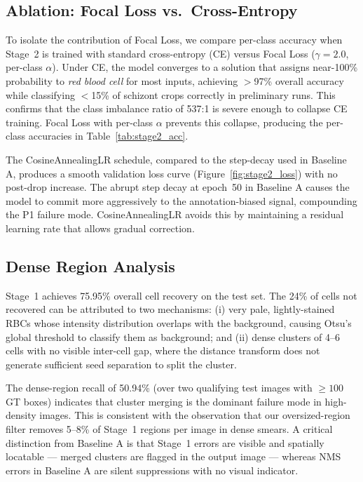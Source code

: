 \documentclass[10pt,twocolumn]{article}
\begin{document}
\subsection{Ablation: Focal Loss vs.\ Cross-Entropy}
\label{ssec:ablation}

To isolate the contribution of Focal Loss, we compare per-class accuracy
when Stage~2 is trained with standard cross-entropy (CE) versus Focal Loss
($\gamma = 2.0$, per-class $\alpha$). Under CE, the model converges to a
solution that assigns near-100\% probability to \textit{red blood cell}
for most inputs, achieving $>$97\% overall accuracy while classifying
$<$15\% of schizont crops correctly in preliminary runs. This confirms
that the class imbalance ratio of 537:1 is severe enough to collapse CE
training. Focal Loss with per-class $\alpha$ prevents this collapse,
producing the per-class accuracies in Table~\ref{tab:stage2_acc}.

The CosineAnnealingLR schedule, compared to the step-decay used in
Baseline A, produces a smooth validation loss curve (Figure~\ref{fig:stage2_loss})
with no post-drop increase. The abrupt step decay at epoch~50 in Baseline A
causes the model to commit more aggressively to the annotation-biased signal,
compounding the P1 failure mode. CosineAnnealingLR avoids this by
maintaining a residual learning rate that allows gradual correction.

\subsection{Dense Region Analysis}
\label{ssec:dense}

Stage~1 achieves 75.95\% overall cell recovery on the test set. The 24\%
of cells not recovered can be attributed to two mechanisms: (i) very pale,
lightly-stained RBCs whose intensity distribution overlaps with the
background, causing Otsu's global threshold to classify them as background;
and (ii) dense clusters of 4--6 cells with no visible inter-cell gap,
where the distance transform does not generate sufficient seed separation
to split the cluster.

The dense-region recall of 50.94\% (over two qualifying test images with
$\geq 100$ GT boxes) indicates that cluster merging is the dominant failure
mode in high-density images. This is consistent with the observation that
our oversized-region filter removes 5--8\% of Stage~1 regions per image
in dense smears. A critical distinction from Baseline A is that Stage~1
errors are visible and spatially locatable --- merged clusters are flagged
in the output image --- whereas NMS errors in Baseline A are silent
suppressions with no visual indicator.
\end{document}
